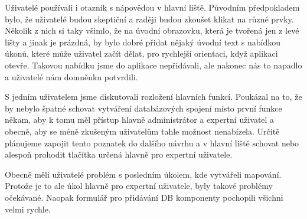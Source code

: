 Uživatelé používali i otazník s nápovědou v hlavní liště. Původním předpokladem bylo, že uživatelé budou skeptiční a raději budou zkoušet klikat na různé prvky. Několik z nich si taky všimlo, že na úvodní obrazovku, která je tvořená jen z levé lišty a jinak je prázdná, by bylo dobré přidat nějaký úvodní text s nabídkou úkonů, které může uživatel začít dělat, pro rychlejší orientaci, když aplikaci otevře. Takovou nabídku jsme do aplikace nepřidávali, ale nakonec nás to napadlo a uživatelé nám domněnku potvrdili.

S jedním uživatelem jsme diskutovali rozložení hlavních funkcí. Poukázal na to, že by nebylo špatné schovat vytváření databázových spojení místo první funkce někam, aby k tomu měl přístup hlavně administrátor a expertní uživatel a obecně, aby se méně zkušeným uživatelům tahle možnost nenabízela. Určitě plánujeme zapojit tento poznatek do dalšího návrhu a v hlavní liště schovat nebo alespoň prohodit tlačítka určená hlavně pro expertní uživatele.

Obecně měli uživatelé problém s posledním úkolem, kde vytvářeli mapování. Protože je to ale úkol hlavně pro expertní uživatele, byly takové problémy očekávané. Naopak formulář pro přidávání DB komponenty pochopili všichni velmi rychle.
